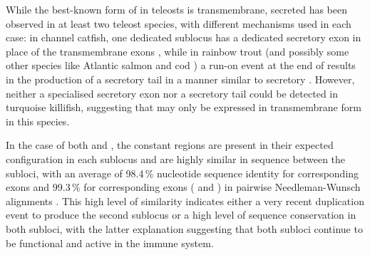 	While the best-known form of  in teleosts is transmembrane, secreted  has been observed in at least two teleost species, with different mechanisms used in each case: in channel catfish, one dedicated sublocus has a dedicated  secretory exon in place of the transmembrane exons \parencite{bengten2006catfish}, while in rainbow trout (and possibly some other species like Atlantic salmon and cod \parencite{ramirezgomez2012secretoryigd}) a run-on event at the end of  results in the production of a secretory tail in a manner similar to secretory  \parencite{ramirezgomez2012secretoryigd}. However, neither a specialised secretory exon nor a  secretory tail could be detected in turquoise killifish, suggesting that  may only be expressed in transmembrane form in this species.
	
	In the case of both  and , the constant regions are present in their expected configuration in each sublocus and are highly similar in sequence between the subloci, with an average of 98.4\,\% nucleotide sequence identity for corresponding  exons and 99.3\,\% for corresponding  exons ( and ) in pairwise Needleman-Wunsch alignments \parencite{needleman1970alignment}. This high level of similarity indicates either a very recent duplication event to produce the second sublocus or a high level of sequence conservation in both subloci, with the latter explanation suggesting that both subloci continue to be functional and active in the immune system.
	
